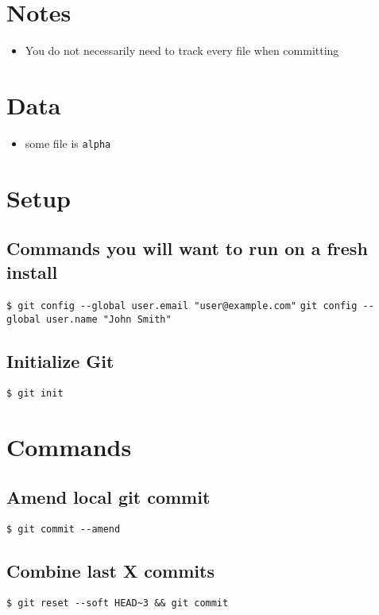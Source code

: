 \documentclass{article}
\title{\vspace{-2.25cm}{\small Git}\vspace{-1.5cm}}
\date{}
\begin{document}
\maketitle
\begin{multicols}{3}
	
\section{Notes}
\begin{itemize}
\item You do not necessarily need to track every file when committing

\end{itemize}

\section{Data}
\begin{itemize}
\item some file is \texttt{alpha}
\end{itemize}

\section{Setup}
\subsection{Commands you will want to run on a fresh install}
\lstinline|$ git config --global user.email "user@example.com"|
\lstinline|git config --global user.name "John Smith"|

\subsection{Initialize Git}
\lstinline|$ git init|
\section{Commands}

\subsection{Amend local git commit}
\lstinline|$ git commit --amend|

\subsection{Combine last X commits}
\lstinline|$ git reset --soft HEAD~3 && git commit|


\end{multicols}
\end{document}
